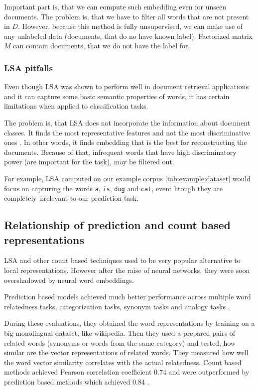     Important part is, that we can compute such embedding even for unseen documents.
    The problem is, that we have to filter all words that are not present in $D$. 
    However, because this method is fully unsupervised, we can make use of any unlabeled data (documents, that do no have known label). 
    Factorized matrix $M$ can contain documents, that we do not have the label for.
    
    \subsubsection{LSA pitfalls}

    Even though LSA was shown to perform well in document retrieval applications and it can capture some basic semantic properties of words,
    it has certain limitations when applied to classification tasks. 
    
    The problem is, that LSA does not incorporate the information about document classes. 
    It finds the most representative features and not the most discriminative ones \cite{berry1995using}.
    In other words, it finds embedding that is the best for reconstructing the documents.
    Because of that, infrequent words that have high discriminatory power (are important for the task), may be filtered out.
    
    For example, LSA computed on our example corpus \ref{tab:example:dataset} would focus on capturing the words \texttt{a}, \texttt{is}, \texttt{dog} and \texttt{cat},
    event htough they are completely irrelevant to our prediction task.
    
    
    \subsection{Relationship of prediction and count based representations}
        
    LSA and other count based techniques used to be very popular alternative to local representations.
    However after the raise of neural networks, they were soon overshadowed by neural word embeddings.
    
    Prediction based models achieved much better performance across multiple word relatedness tasks, categorization tasks, synonym tasks and analogy tasks \cite{baroni2014don}. %
    
    During these evaluations, they obtained the word representations by training on a big monolingual dataset, like wikipedia.
    Then they used a prepared pairs of related words (synonyms or words from the same category) and tested,
    how similar are the vector representations of related words. 
    They measured how well the word vector similarity correlates with the actual relatedness. 
    Count based methods achieved Pearson correlation coefficient $0.74$ and were outperformed by prediction based methods which achieved $0.84$ \cite{baroni2014don}.
    
